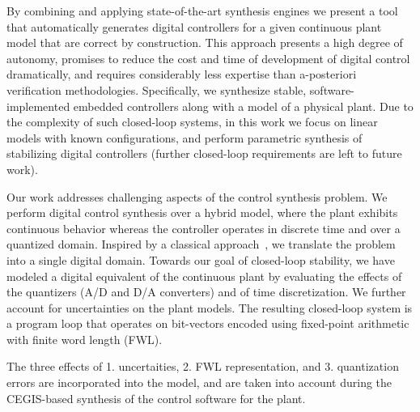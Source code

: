 \documentclass[final]{sig-alternate-05-2015}
\newcommand{\aabatecmt}[1]{}%
\begin{document}
By combining and applying state-of-the-art synthesis engines we present a 
tool that automatically generates digital controllers for a given 
continuous plant model that are correct by construction.  
This approach presents a high degree of autonomy, 
promises to reduce the cost and time of development of digital control dramatically, 
and requires considerably less expertise than a-posteriori verification methodologies.   
Specifically, we synthesize stable,  
software-implemented embedded controllers along with a model of a physical plant. 
Due to the complexity of such closed-loop systems, in this work we focus
on linear models with known configurations, and perform parametric synthesis
of stabilizing digital controllers (further closed-loop requirements are left to future work). 

Our work addresses challenging aspects of the control synthesis problem.  We
perform digital control synthesis over a hybrid model, where the plant
exhibits continuous behavior whereas the controller operates in discrete
time and over a quantized domain.  Inspired by a classical
approach~\cite{astrom1997computer}, we translate the problem into a single
digital domain.  
Towards our goal of closed-loop stability, 
we have modeled a digital equivalent of the continuous plant by evaluating the effects of the quantizers (A/D and D/A converters) and of time
discretization. 
We further account for uncertainties on the plant models. 
The resulting closed-loop system is a program loop that operates on bit-vectors encoded using
fixed-point arithmetic with finite word length (FWL). 
\aabatecmt{[match list ordering with later one.]}
The three effects of 1. uncertaities, 2. FWL representation, and 3. quantization errors are incorporated into the model, 
and are taken into account during the CEGIS-based synthesis of the control software for the plant.
\end{document}
